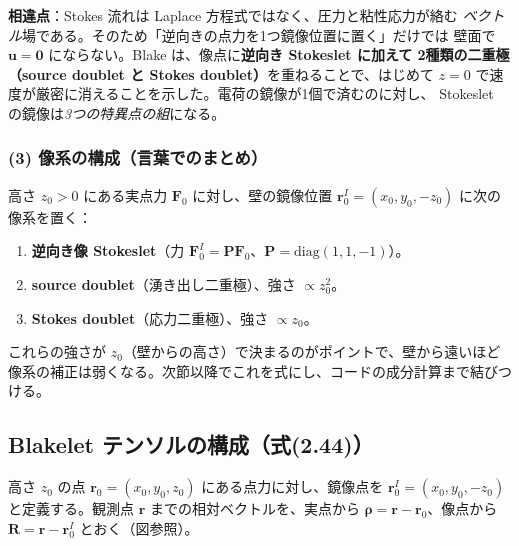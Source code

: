 \documentclass[11pt,a4paper]{article}
\newcommand{\rv}{\bm{r}}
\begin{document}
\begin{warnbox}
\textbf{相違点}：Stokes 流れは Laplace 方程式ではなく、圧力と粘性応力が絡む
\emph{ベクトル}場である。そのため「逆向きの点力を1つ鏡像位置に置く」だけでは
壁面で $\bm u=\bm 0$ にならない。Blake は、像点に\textbf{逆向き Stokeslet に加えて
2種類の二重極（source doublet と Stokes doublet）}を重ねることで、はじめて
$z=0$ で速度が厳密に消えることを示した。電荷の鏡像が1個で済むのに対し、
Stokeslet の鏡像は\emph{3つの特異点の組}になる。
\end{warnbox}

\subsubsection{(3) 像系の構成（言葉でのまとめ）}

高さ $z_0>0$ にある実点力 $\bm F_0$ に対し、壁の鏡像位置
$\rv_0^{I}=(x_0,y_0,-z_0)$ に次の像系を置く：
\begin{enumerate}\setlength{\itemsep}{1pt}
\item \textbf{逆向き像 Stokeslet}（力 $\bm F_0^{I}=\bm P\bm F_0$、$\bm P=\mathrm{diag}(1,1,-1)$）。
\item \textbf{source doublet}（湧き出し二重極）、強さ $\propto z_0^2$。
\item \textbf{Stokes doublet}（応力二重極）、強さ $\propto z_0$。
\end{enumerate}
これらの強さが $z_0$（壁からの高さ）で決まるのがポイントで、壁から遠いほど
像系の補正は弱くなる。次節以降でこれを式にし、コードの成分計算まで結びつける。

\subsection{Blakelet テンソルの構成（式(2.44)）}

高さ $z_0$ の点 $\rv_0=(x_0,y_0,z_0)$ にある点力に対し、鏡像点を
$\rv_0^{I}=(x_0,y_0,-z_0)$ と定義する。観測点 $\rv$ までの相対ベクトルを、実点から
$\bm\rho=\rv-\rv_0$、像点から $\bm R=\rv-\rv_0^{I}$ とおく（図参照）。
\end{document}
